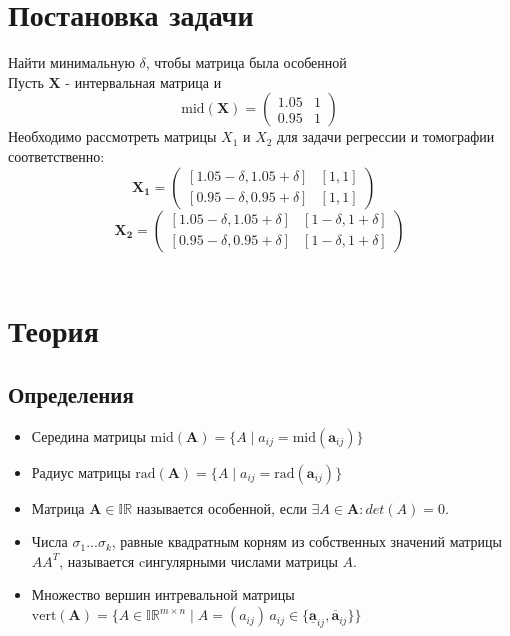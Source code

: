 \documentclass[a4paper,12pt]{article}
\begin{document}
\section{Постановка задачи}
Найти минимальную $\delta$, чтобы матрица была особенной\\
Пусть $\textbf{X}$ - интервальная матрица и
\begin{equation}
\mathrm{mid}(\textbf{X})=
\begin{pmatrix}
1.05 & 1 \\
0.95 & 1
\end{pmatrix} 
\end{equation}
Необходимо рассмотреть матрицы $X_1$ и $X_2$ для задачи регрессии и томографии соответственно:
\begin{equation}
\mathbf{X_1}=
\begin{pmatrix}
[1.05-\delta, 1.05+\delta] & [1, 1] \\
[0.95-\delta, 0.95+\delta] & [1, 1]
\end{pmatrix} \;\;\;
\end{equation}
\begin{equation}
\mathbf{X_2}=
\begin{pmatrix}
[1.05-\delta, 1.05+\delta] & [1-\delta, 1+\delta] \\
[0.95-\delta, 0.95+\delta] & [1-\delta, 1+\delta]
\end{pmatrix}
\end{equation}\\



\section{Теория}
\subsection{Определения}
\begin{itemize}
    \item Середина матрицы $\mathrm{mid}(\textbf{A})=\{A\;|\;a_{ij}=\mathrm{mid}(\textbf{a}_{ij})\}$
    \item Радиус матрицы $\mathrm{rad}(\textbf{A})=\{A\;|\;a_{ij}=\mathrm{rad}(\textbf{a}_{ij})\}$
    \item Матрица $\textbf{A}\in \mathbb{IR}$ называется особенной, если $\exists A \in \textbf{A} : det(A) = 0$.
    \item Числа $\sigma_1...\sigma_k$, равные квадратным корням из собственных значений матрицы $AA^T$, называется cингулярными числами матрицы $A$.
    \item Множество вершин интревальной матрицы\\ $\mathrm{vert}(\textbf{A})=\{A\in\mathbb{IR}^{m\times n} \;|\; A=(a_{ij}) \, a_{ij}\in\{\underline{\textbf{a}}_{ij}, \overline{\textbf{a}}_{ij}\}\}$
\end{itemize}
\end{document}

